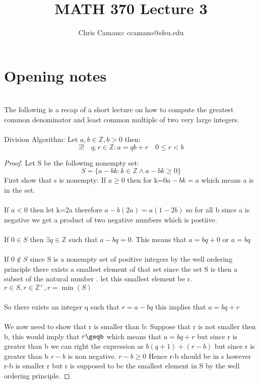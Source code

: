 \documentclass[12pt]{article}
\author{Chris Camano: ccamano@sfsu.edu}
\title{MATH 370  Lecture 3 }
\date
\newcommand{\sect}[1]{\section*{#1}}
\newcommand{\Z}{\mathbb{Z}}
\theoremstyle{definition}
\theoremstyle{remark}
\numberwithin{equation}{section}
\begin{document}
\maketitle

\sect{Opening notes}\\
The following is a recap of a short lecture on how to compute the greatest common denominator and least common multiple of two very large integers. \\\\
\thm Division Algorithm:
Let $a,b\in \Z, b>0$ then:
\[
  \exists !\quad q,r \in \Z : a=qb+r\quad 0\leq r < b
\]
\begin{proof}
  Let S be the following nonempty set:
  \[
    S=\{a-bk: k \in \Z \land a-bk \geq0\}
  \]
  First show that s is nonempty: If $a\geq 0$ then for k=0$ a-bk=a$ which means a is in the set. \\\\
  If $a<0$ then let k=2a therefore $a-b(2a)=a(1-2b)$ so for all b since a is negative we get a product of two negative numbers which is postiive. \\\\
  If $0 \in S $ then $\exists q \in \Z$ such that $a-bq=0$. This means that $a=bq+0$ or $a=bq$ \\\\
If $0 \notin S$ since S is a nonempty set of positive integers by the well ordering principle there exists a smallest element of that set since the set S is then a subset of the natural number . let this smallest element be r. $r\in S, r\in \Z^+, r=\min(S)$\\\\
So there exists an integer q such that $r=a-bq$ this implies that $a=bq+r$ \\\\
We now need to show that r is smaller than b: Suppose that r is not smaller then b, this would imply that $r\geqb$ which means that $a=bq+r$ but since r is greater than b we can right the expression as $b(q+1)+(r-b)$ but since r is greater than b $ r-b$ is non negative. $r-b \geq 0$ Hence r-b should be in s however r-b is smaller r but r is supposed to be the smallest element in S by the well ordering principle. 
\end{proof}
\end{document}
